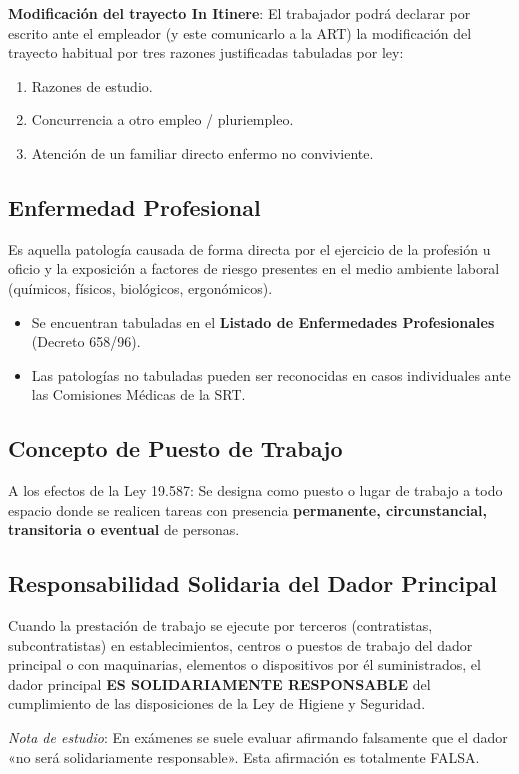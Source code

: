\documentclass[]{informeutn}
\begin{document}
\textbf{Modificación del trayecto In Itinere}: El trabajador podrá declarar por escrito ante el empleador (y este comunicarlo a la ART) la modificación del trayecto habitual por tres razones justificadas tabuladas por ley:
\begin{enumerate}
    \item Razones de estudio.
    \item Concurrencia a otro empleo / pluriempleo.
    \item Atención de un familiar directo enfermo no conviviente.
\end{enumerate}

\subsection{Enfermedad Profesional}
Es aquella patología causada de forma directa por el ejercicio de la profesión u oficio y la exposición a factores de riesgo presentes en el medio ambiente laboral (químicos, físicos, biológicos, ergonómicos). 
\begin{itemize}
    \item Se encuentran tabuladas en el \textbf{Listado de Enfermedades Profesionales} (Decreto 658/96).
    \item Las patologías no tabuladas pueden ser reconocidas en casos individuales ante las Comisiones Médicas de la SRT.
\end{itemize}

\subsection{Concepto de Puesto de Trabajo}
A los efectos de la Ley 19.587: Se designa como puesto o lugar de trabajo a todo espacio donde se realicen tareas con presencia \textbf{permanente, circunstancial, transitoria o eventual} de personas.

\subsection{Responsabilidad Solidaria del Dador Principal}
\begin{tcolorbox}[title=Art. 4° Ley 19.587 - Tercerizaciones]
Cuando la prestación de trabajo se ejecute por terceros (contratistas, subcontratistas) en establecimientos, centros o puestos de trabajo del dador principal o con maquinarias, elementos o dispositivos por él suministrados, el dador principal \textbf{ES SOLIDARIAMENTE RESPONSABLE} del cumplimiento de las disposiciones de la Ley de Higiene y Seguridad.
\end{tcolorbox}
\textit{Nota de estudio}: En exámenes se suele evaluar afirmando falsamente que el dador «no será solidariamente responsable». Esta afirmación es totalmente FALSA.
\end{document}
